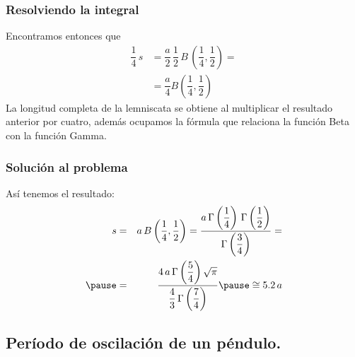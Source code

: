 \documentclass[12pt]{beamer}
\begin{document}
\begin{frame}
\frametitle{Resolviendo la integral}
Encontramos entonces que
\begin{align*}
\dfrac{1}{4} \, s &= \dfrac{a}{2} \, \dfrac{1}{2} \, B \, \left(\dfrac{1}{4}, \dfrac{1}{2} \right) = \\[1em]
&= \dfrac{a}{4} B\left(\dfrac{1}{4}, \dfrac{1}{2} \right)
\end{align*}
\pause
\fontsize{12}{12}\selectfont
La longitud completa de la lemniscata se obtiene al multiplicar el resultado anterior por cuatro, además ocupamos la fórmula que relaciona la función Beta con la función Gamma.
\end{frame}
\begin{frame}
\frametitle{Solución al problema}
Así tenemos el resultado:
\begin{eqnarray*}
s &=& a \, B\left(\dfrac{1}{4}, \dfrac{1}{2} \right) = \dfrac{a \, \Gamma \left( \dfrac{1}{4} \right) \, \Gamma \left( \dfrac{1}{2} \right) }{\Gamma \left( \dfrac{3}{4} \right)} = \\ \pause
&=& \dfrac{4 \, a \, \Gamma \left( \dfrac{5}{4} \right) \sqrt{\pi}}{\dfrac{4}{3} \, \Gamma \left( \dfrac{7}{4} \right)} \pause \cong 5.2 \, a
\end{eqnarray*}
\end{frame}

\subsection{Período de oscilación de un péndulo.}
\end{document}
